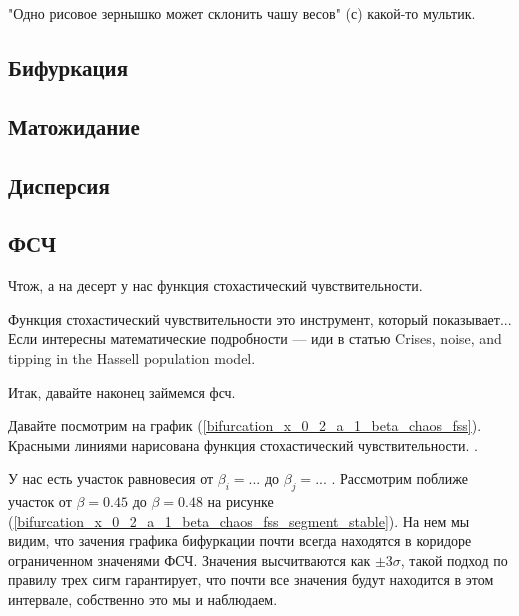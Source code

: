         "Одно рисовое зернышко может склонить чашу весов" (с) какой-то мультик.


    \subsection{Бифуркация}


    \subsection{Матожидание}


    \subsection{Дисперсия}


    \subsection{ФСЧ}
    
        Чтож, а на десерт у нас функция стохастический чувствительности.

        Функция стохастический чувствительности это инструмент, который показывает... Если интересны математические подробности --- иди в статью Crises, noise, and tipping in the Hassell population model.

        Итак, давайте наконец займемся фсч. 

        Давайте посмотрим на график (\ref{bifurcation_x_0_2_a_1_beta_chaos_fss}). Красными линиями нарисована функция стохастический чувствительности. . 

        У нас есть участок равновесия от \(\beta_i = ...\) до \(\beta_j = ...\) . Рассмотрим поближе участок от \(\beta = 0.45\) до \(\beta = 0.48\) на рисунке (\ref{bifurcation_x_0_2_a_1_beta_chaos_fss_segment_stable}). На нем мы видим, что зачения графика бифуркации почти всегда находятся в коридоре ограниченном значенями ФСЧ. Значения высчитваются как \(\pm 3 \sigma\), такой подход по правилу трех сигм гарантирует, что почти все значения будут находится в этом интервале, собственно это мы и наблюдаем.

